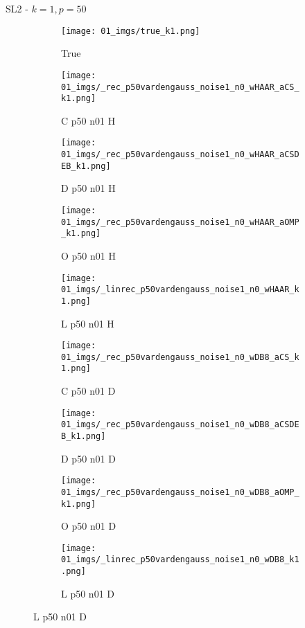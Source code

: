 \begin{frame}{SL2 - $k=1,p=50$}{}
\begin{figure}
\begin{subfigure}{0.1\textwidth}
\texttt{[image: 01\_imgs/true\_k1.png]}
\caption*{\Tiny True}
\end{subfigure}
\begin{subfigure}{0.1\textwidth}
\texttt{[image: 01\_imgs/\_rec\_p50vardengauss\_noise1\_n0\_wHAAR\_aCS\_k1.png]}
\caption*{\Tiny C p50 n01 H}
\end{subfigure}
\begin{subfigure}{0.1\textwidth}
\texttt{[image: 01\_imgs/\_rec\_p50vardengauss\_noise1\_n0\_wHAAR\_aCSDEB\_k1.png]}
\caption*{\Tiny D p50 n01 H}
\end{subfigure}
\begin{subfigure}{0.1\textwidth}
\texttt{[image: 01\_imgs/\_rec\_p50vardengauss\_noise1\_n0\_wHAAR\_aOMP\_k1.png]}
\caption*{\Tiny O p50 n01 H}
\end{subfigure}
\begin{subfigure}{0.1\textwidth}
\texttt{[image: 01\_imgs/\_linrec\_p50vardengauss\_noise1\_n0\_wHAAR\_k1.png]}
\caption*{\Tiny L p50 n01 H}
\end{subfigure}
\begin{subfigure}{0.1\textwidth}
\texttt{[image: 01\_imgs/\_rec\_p50vardengauss\_noise1\_n0\_wDB8\_aCS\_k1.png]}
\caption*{\Tiny C p50 n01 D}
\end{subfigure}
\begin{subfigure}{0.1\textwidth}
\texttt{[image: 01\_imgs/\_rec\_p50vardengauss\_noise1\_n0\_wDB8\_aCSDEB\_k1.png]}
\caption*{\Tiny D p50 n01 D}
\end{subfigure}
\begin{subfigure}{0.1\textwidth}
\texttt{[image: 01\_imgs/\_rec\_p50vardengauss\_noise1\_n0\_wDB8\_aOMP\_k1.png]}
\caption*{\Tiny O p50 n01 D}
\end{subfigure}
\begin{subfigure}{0.1\textwidth}
\texttt{[image: 01\_imgs/\_linrec\_p50vardengauss\_noise1\_n0\_wDB8\_k1.png]}
\caption*{\Tiny L p50 n01 D}
\end{subfigure}

\vspace{5pt}


\end{figure}
\end{frame}
